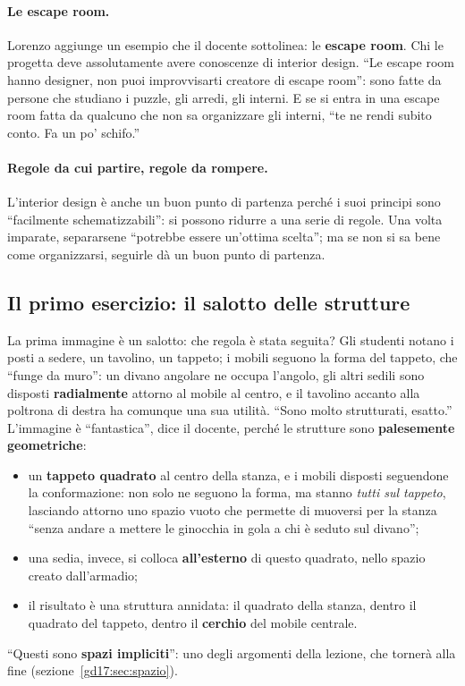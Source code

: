 \paragraph{Le escape room.} Lorenzo aggiunge un esempio che il docente sottolinea: le
\textbf{escape room}. Chi le progetta deve assolutamente avere conoscenze di interior
design. ``Le escape room hanno designer, non puoi improvvisarti creatore di escape
room'': sono fatte da persone che studiano i puzzle, gli arredi, gli interni. E se si
entra in una escape room fatta da qualcuno che non sa organizzare gli interni, ``te ne
rendi subito conto. Fa un po' schifo.''

\paragraph{Regole da cui partire, regole da rompere.} L'interior design è anche un
buon punto di partenza perché i suoi principi sono ``facilmente schematizzabili'':
si possono ridurre a una serie di regole. Una volta imparate, separarsene ``potrebbe
essere un'ottima scelta''; ma se non si sa bene come organizzarsi, seguirle dà un buon
punto di partenza.

\subsection{Il primo esercizio: il salotto delle strutture}
\label{gd17:sec:salotto}

La prima immagine è un salotto: che regola è stata seguita? Gli studenti notano i posti
a sedere, un tavolino, un tappeto; i mobili seguono la forma del tappeto, che ``funge
da muro'': un divano angolare ne occupa l'angolo, gli altri sedili sono disposti
\textbf{radialmente} attorno al mobile al centro, e il tavolino accanto alla poltrona di
destra ha comunque una sua utilità. ``Sono molto strutturati, esatto.'' L'immagine è
``fantastica'', dice il docente, perché le strutture sono \textbf{palesemente
geometriche}:
\begin{itemize}
  \item un \textbf{tappeto quadrato} al centro della stanza, e i mobili disposti
        seguendone la conformazione: non solo ne seguono la forma, ma stanno
        \emph{tutti sul tappeto}, lasciando attorno uno spazio vuoto che permette di
        muoversi per la stanza ``senza andare a mettere le ginocchia in gola a chi è
        seduto sul divano'';
  \item una sedia, invece, si colloca \textbf{all'esterno} di questo quadrato, nello
        spazio creato dall'armadio;
  \item il risultato è una struttura annidata: il quadrato della stanza, dentro il
        quadrato del tappeto, dentro il \textbf{cerchio} del mobile centrale.
\end{itemize}
``Questi sono \textbf{spazi impliciti}'': uno degli argomenti della lezione, che tornerà
alla fine (sezione~\ref{gd17:sec:spazio}).

